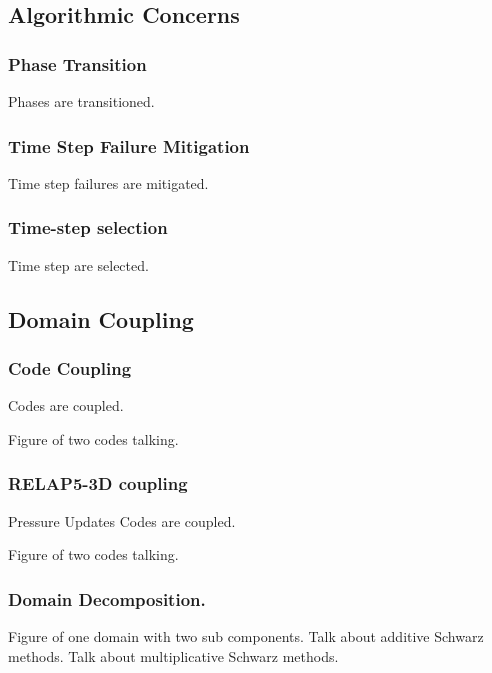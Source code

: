 \documentclass[compress]{beamer}
\begin{document}
\subsection[Algorithmic Concerns]{Algorithmic Concerns}
\begin{frame}
\frametitle{Phase Transition}

Phases are transitioned.

\end{frame}
\begin{frame}
\frametitle{Time Step Failure Mitigation}

Time step failures are mitigated.

\end{frame}
\begin{frame}
\frametitle{Time-step selection}

Time step are selected.

\end{frame}
\subsection[Domain Coupling]{Domain Coupling}
\begin{frame}
\frametitle{Code Coupling}

Codes are coupled.

Figure of two codes talking.

\end{frame}
\begin{frame}
\frametitle{RELAP5-3D coupling}

Pressure Updates
Codes are coupled.

Figure of two codes talking.

\end{frame}
\begin{frame}
\frametitle{Domain Decomposition.}

Figure of one domain with two sub components.
Talk about additive Schwarz methods.
Talk about multiplicative Schwarz methods.

\end{frame}
\end{document}
